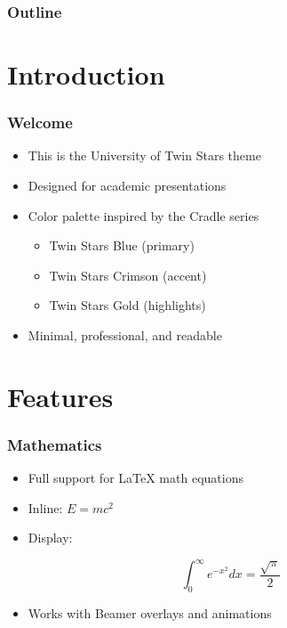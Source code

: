 \documentclass[aspectratio=169]{beamer}
\begin{document}
\titlepage

\begin{frame}
    \frametitle{Outline}
    \tableofcontents
\end{frame}

\section{Introduction}

\begin{frame}
    \frametitle{Welcome}
    \begin{itemize}
        \item This is the University of Twin Stars theme
        \item Designed for academic presentations
        \item Color palette inspired by the Cradle series
              \begin{itemize}
                  \item \textcolor{TwinStarsBlue}{Twin Stars Blue} (primary)
                  \item \textcolor{TwinStarsCrimson}{Twin Stars Crimson} (accent)
                  \item \textcolor{TwinStarsGold}{Twin Stars Gold} (highlights)
              \end{itemize}
        \item Minimal, professional, and readable
    \end{itemize}
\end{frame}

\section{Features}

\begin{frame}
    \frametitle{Mathematics}
    \begin{itemize}
        \item Full support for \LaTeX{} math equations
        \item Inline: $E = mc^2$
        \item Display:
    \end{itemize}
    \begin{equation}
        \int_0^\infty e^{-x^2} dx = \frac{\sqrt{\pi}}{2}
    \end{equation}
    \begin{itemize}
        \item Works with Beamer overlays and animations
    \end{itemize}
\end{frame}
\end{document}
